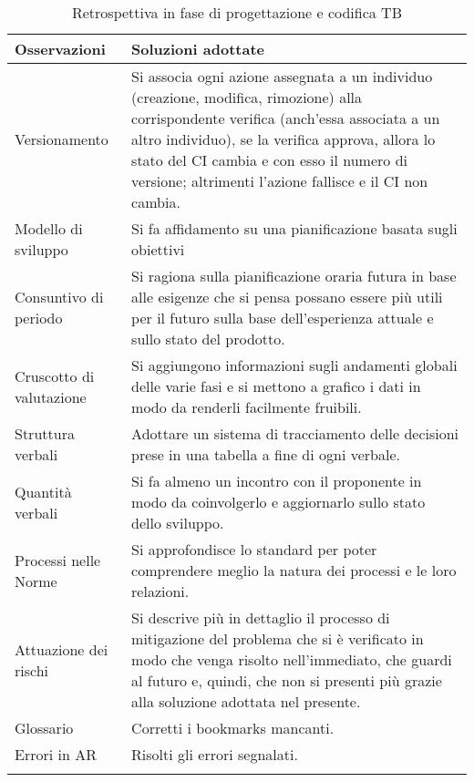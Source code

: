 \documentclass[../piano_di_qualifica.tex]{subfiles}
\begin{document}
\begin{center}
	\begin{longtable}{|p{4cm}|p{11cm}|}
		\hline
		\rowcolor{lightgray}
		\textbf{Osservazioni}   & \textbf{Soluzioni adottate} \\
		\hline

		Versionamento & Si associa ogni azione assegnata a un individuo (creazione, modifica, rimozione) alla corrispondente verifica (anch'essa associata a un altro individuo), se la verifica approva, allora lo stato del CI cambia e con esso il numero di versione; altrimenti l'azione fallisce e il CI non cambia. \\
		Modello di sviluppo & Si fa affidamento su una pianificazione basata sugli obiettivi \\
		Consuntivo di periodo & Si ragiona sulla pianificazione oraria futura in base alle esigenze che si pensa possano essere più utili per il futuro sulla base dell'esperienza attuale e sullo stato del prodotto. \\
		Cruscotto di valutazione & Si aggiungono informazioni sugli andamenti globali delle varie fasi e si mettono a grafico i dati in modo da renderli facilmente fruibili. \\
		Struttura verbali & Adottare un sistema di tracciamento delle decisioni prese in una tabella a fine di ogni verbale. \\
		Quantità verbali & Si fa almeno un incontro con il proponente in modo da coinvolgerlo e aggiornarlo sullo stato dello sviluppo. \\
		Processi nelle Norme & Si approfondisce lo standard \glossario{ISO/IEC 12207} per poter comprendere meglio la natura dei processi e le loro relazioni. \\
		Attuazione dei rischi & Si descrive più in dettaglio il processo di mitigazione del problema che si è verificato in modo che venga risolto nell'immediato, che guardi al futuro e, quindi, che non si presenti più grazie alla soluzione adottata nel presente. \\
		Glossario & Corretti i bookmarks mancanti. \\
		Errori in AR & Risolti gli errori segnalati. \\

		\hline
		\rowcolor{white}
		\caption{Retrospettiva in fase di progettazione e codifica TB}
	\end{longtable}
\end{center}

\end{document}
